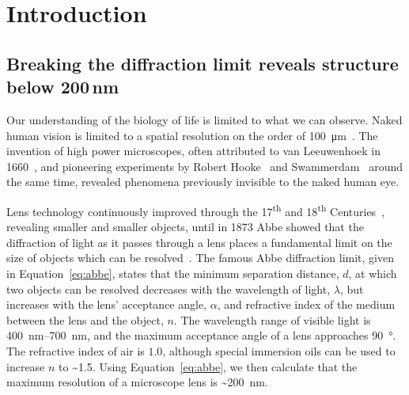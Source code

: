 
\chapter{Introduction}  %

\ifpdf
    \graphicspath{{Chapter1/Figs/Raster/}{Chapter1/Figs/PDF/}{Chapter1/Figs/}}
\else
    \graphicspath{{Chapter1/Figs/Vector/}{Chapter1/Figs/}}
\fi

\section{Breaking the diffraction limit reveals structure below 200\,nm}
Our understanding of the biology of life is limited to what we can observe. 
Naked human vision is limited to a spatial resolution on the order of \SI{100}{\micro\metre}~\cite{devalois1990spatial}.
The invention of high power microscopes, often attributed to van Leeuwenhoek in 1660~\cite{van1800select}, and pioneering experiments by Robert Hooke~\cite{hooke1667micrographia} and Swammerdam~\cite{swammerdam1758book} around the same time, revealed phenomena previously invisible to the naked human eye. 

Lens technology continuously improved through the 17\textsuperscript{th} and 18\textsuperscript{th} Centuries~\cite{dollond1753xiv, daumas1972scientific}, revealing smaller and smaller objects, until in 1873 Abbe showed that the diffraction of light as it passes through a lens places a fundamental limit on the size of objects which can be resolved~\cite{abbe1873beitrage}. The famous Abbe diffraction limit, given in Equation~\ref{eq:abbe}, states that the minimum separation distance, $d$, at which two objects can be resolved decreases with the wavelength of light, $\lambda$, but increases with the lens' acceptance angle, $\alpha$, and refractive index of the medium between the lens and the object, $n$. The wavelength range of visible light is \SIrange[range-phrase=--]{400}{700}{\nano\metre}, and the maximum acceptance angle of a lens approaches \SI{90}{\degree}. The refractive index of air is $1.0$, although special immersion oils can be used to increase $n$ to \textasciitilde\num{1.5}. Using Equation~\ref{eq:abbe}, we then calculate that the maximum resolution of a microscope lens is \textasciitilde\SI{200}{\nano\metre}. 

